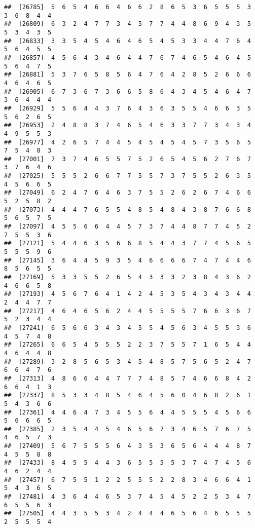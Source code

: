 \documentclass[
]{book}
\begin{document}
\begin{verbatim}
##  [26785]  5  6  5  4  6  6  4  6  6  2  8  6  5  3  6  5  5  5  3  3  6  8  4  4
##  [26809]  6  3  2  4  7  7  3  4  5  7  7  4  4  8  6  9  4  3  5  5  3  4  3  5
##  [26833]  3  3  5  4  5  4  6  4  6  5  4  5  3  3  4  4  7  6  4  5  6  4  5  5
##  [26857]  4  5  6  4  3  4  6  4  4  7  6  7  4  6  5  4  6  4  5  5  6  4  7  5
##  [26881]  5  3  7  6  5  8  5  6  4  7  6  4  2  8  5  2  6  6  6  4  6  4  6  5
##  [26905]  6  7  3  6  7  3  6  6  5  8  6  4  3  4  5  4  6  4  7  3  6  4  4  4
##  [26929]  5  5  6  4  4  3  7  6  4  3  6  3  5  5  4  6  6  3  5  5  6  2  6  5
##  [26953]  2  4  8  8  3  7  4  6  5  4  6  3  3  7  7  3  4  3  4  4  9  5  5  3
##  [26977]  4  2  6  5  7  4  4  5  4  5  4  5  4  5  7  3  5  6  5  7  5  4  8  3
##  [27001]  7  3  7  4  6  5  5  7  5  2  6  5  4  5  6  2  7  6  7  3  7  6  4  6
##  [27025]  5  5  5  2  6  6  7  7  5  5  7  3  7  5  5  2  6  3  5  4  5  6  6  5
##  [27049]  6  2  4  7  6  4  6  3  7  5  5  2  6  2  6  7  4  6  6  5  2  5  8  2
##  [27073]  4  4  4  7  6  5  5  4  8  5  4  8  4  3  8  7  6  6  8  5  6  5  7  5
##  [27097]  4  5  5  6  6  4  4  5  7  3  7  4  4  8  7  7  4  5  2  7  5  5  3  6
##  [27121]  5  4  4  6  3  5  6  6  8  5  4  4  3  7  7  4  5  6  5  5  5  5  9  6
##  [27145]  3  6  4  4  5  9  3  5  4  6  6  6  6  7  4  7  4  4  6  8  5  6  5  5
##  [27169]  5  3  3  5  5  2  6  5  4  3  3  3  2  3  8  4  3  6  2  4  6  6  5  8
##  [27193]  4  5  6  7  6  4  1  4  2  4  5  3  5  4  3  4  3  4  4  2  4  4  7  7
##  [27217]  4  6  4  6  5  6  2  4  4  5  5  5  5  7  6  6  3  6  7  5  2  3  4  4
##  [27241]  6  5  6  6  3  4  3  4  5  5  4  5  6  3  4  5  5  3  6  4  5  7  4  8
##  [27265]  6  6  5  4  5  5  5  2  2  3  7  5  5  7  1  6  5  4  4  4  6  4  4  8
##  [27289]  3  2  8  5  6  5  3  4  5  4  8  5  7  5  6  5  2  4  7  6  6  4  7  6
##  [27313]  4  8  6  6  4  4  7  7  7  4  8  5  7  4  6  6  8  4  2  6  6  4  1  3
##  [27337]  8  5  3  3  4  8  5  4  6  4  5  6  0  4  6  8  2  6  1  5  4  3  6  6
##  [27361]  4  4  6  4  7  3  4  5  5  6  4  4  5  5  5  4  5  6  6  5  6  6  6  5
##  [27385]  2  3  5  4  4  5  4  6  5  6  7  3  4  6  5  7  6  7  5  4  6  5  7  3
##  [27409]  5  6  7  5  5  5  6  4  3  5  3  6  5  6  4  4  4  8  7  4  5  5  8  8
##  [27433]  8  4  5  5  4  4  3  6  5  5  5  5  3  7  4  7  4  5  6  4  6  2  4  4
##  [27457]  6  7  5  5  1  2  2  5  5  5  2  2  8  3  4  6  6  4  1  5  4  3  6  5
##  [27481]  4  3  6  4  4  6  5  3  7  4  5  4  5  2  2  5  3  4  7  6  5  5  6  3
##  [27505]  4  4  3  5  5  3  4  2  4  4  4  6  5  6  4  6  5  5  5  2  5  5  5  4

\end{verbatim}
\end{document}
